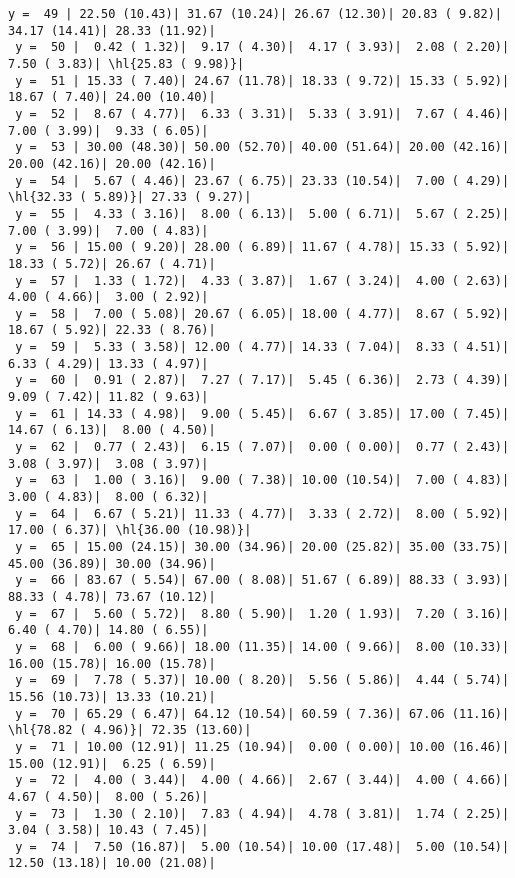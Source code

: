 \documentclass[10pt]{article}
\newcommand{\hl}[1]{\textcolor{blue}{#1}}
\begin{document}
\begin{Verbatim}[fontsize=\small, commandchars=\\\{\}]
 y =  49 | 22.50 (10.43)| 31.67 (10.24)| 26.67 (12.30)| 20.83 ( 9.82)| 34.17 (14.41)| 28.33 (11.92)|
 y =  50 |  0.42 ( 1.32)|  9.17 ( 4.30)|  4.17 ( 3.93)|  2.08 ( 2.20)|  7.50 ( 3.83)| \hl{25.83 ( 9.98)}|
 y =  51 | 15.33 ( 7.40)| 24.67 (11.78)| 18.33 ( 9.72)| 15.33 ( 5.92)| 18.67 ( 7.40)| 24.00 (10.40)|
 y =  52 |  8.67 ( 4.77)|  6.33 ( 3.31)|  5.33 ( 3.91)|  7.67 ( 4.46)|  7.00 ( 3.99)|  9.33 ( 6.05)|
 y =  53 | 30.00 (48.30)| 50.00 (52.70)| 40.00 (51.64)| 20.00 (42.16)| 20.00 (42.16)| 20.00 (42.16)|
 y =  54 |  5.67 ( 4.46)| 23.67 ( 6.75)| 23.33 (10.54)|  7.00 ( 4.29)| \hl{32.33 ( 5.89)}| 27.33 ( 9.27)|
 y =  55 |  4.33 ( 3.16)|  8.00 ( 6.13)|  5.00 ( 6.71)|  5.67 ( 2.25)|  7.00 ( 3.99)|  7.00 ( 4.83)|
 y =  56 | 15.00 ( 9.20)| 28.00 ( 6.89)| 11.67 ( 4.78)| 15.33 ( 5.92)| 18.33 ( 5.72)| 26.67 ( 4.71)|
 y =  57 |  1.33 ( 1.72)|  4.33 ( 3.87)|  1.67 ( 3.24)|  4.00 ( 2.63)|  4.00 ( 4.66)|  3.00 ( 2.92)|
 y =  58 |  7.00 ( 5.08)| 20.67 ( 6.05)| 18.00 ( 4.77)|  8.67 ( 5.92)| 18.67 ( 5.92)| 22.33 ( 8.76)|
 y =  59 |  5.33 ( 3.58)| 12.00 ( 4.77)| 14.33 ( 7.04)|  8.33 ( 4.51)|  6.33 ( 4.29)| 13.33 ( 4.97)|
 y =  60 |  0.91 ( 2.87)|  7.27 ( 7.17)|  5.45 ( 6.36)|  2.73 ( 4.39)|  9.09 ( 7.42)| 11.82 ( 9.63)|
 y =  61 | 14.33 ( 4.98)|  9.00 ( 5.45)|  6.67 ( 3.85)| 17.00 ( 7.45)| 14.67 ( 6.13)|  8.00 ( 4.50)|
 y =  62 |  0.77 ( 2.43)|  6.15 ( 7.07)|  0.00 ( 0.00)|  0.77 ( 2.43)|  3.08 ( 3.97)|  3.08 ( 3.97)|
 y =  63 |  1.00 ( 3.16)|  9.00 ( 7.38)| 10.00 (10.54)|  7.00 ( 4.83)|  3.00 ( 4.83)|  8.00 ( 6.32)|
 y =  64 |  6.67 ( 5.21)| 11.33 ( 4.77)|  3.33 ( 2.72)|  8.00 ( 5.92)| 17.00 ( 6.37)| \hl{36.00 (10.98)}|
 y =  65 | 15.00 (24.15)| 30.00 (34.96)| 20.00 (25.82)| 35.00 (33.75)| 45.00 (36.89)| 30.00 (34.96)|
 y =  66 | 83.67 ( 5.54)| 67.00 ( 8.08)| 51.67 ( 6.89)| 88.33 ( 3.93)| 88.33 ( 4.78)| 73.67 (10.12)|
 y =  67 |  5.60 ( 5.72)|  8.80 ( 5.90)|  1.20 ( 1.93)|  7.20 ( 3.16)|  6.40 ( 4.70)| 14.80 ( 6.55)|
 y =  68 |  6.00 ( 9.66)| 18.00 (11.35)| 14.00 ( 9.66)|  8.00 (10.33)| 16.00 (15.78)| 16.00 (15.78)|
 y =  69 |  7.78 ( 5.37)| 10.00 ( 8.20)|  5.56 ( 5.86)|  4.44 ( 5.74)| 15.56 (10.73)| 13.33 (10.21)|
 y =  70 | 65.29 ( 6.47)| 64.12 (10.54)| 60.59 ( 7.36)| 67.06 (11.16)| \hl{78.82 ( 4.96)}| 72.35 (13.60)|
 y =  71 | 10.00 (12.91)| 11.25 (10.94)|  0.00 ( 0.00)| 10.00 (16.46)| 15.00 (12.91)|  6.25 ( 6.59)|
 y =  72 |  4.00 ( 3.44)|  4.00 ( 4.66)|  2.67 ( 3.44)|  4.00 ( 4.66)|  4.67 ( 4.50)|  8.00 ( 5.26)|
 y =  73 |  1.30 ( 2.10)|  7.83 ( 4.94)|  4.78 ( 3.81)|  1.74 ( 2.25)|  3.04 ( 3.58)| 10.43 ( 7.45)|
 y =  74 |  7.50 (16.87)|  5.00 (10.54)| 10.00 (17.48)|  5.00 (10.54)| 12.50 (13.18)| 10.00 (21.08)|

\end{Verbatim}
\end{document}
